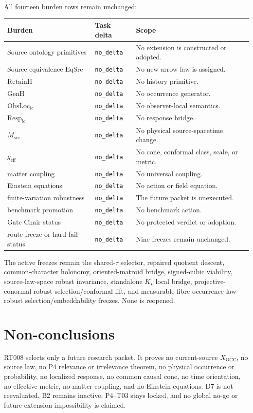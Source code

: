 \documentclass[11pt]{article}
\newcommand{\NoDelta}{\texttt{no\_delta}}
\begin{document}
All fourteen burden rows remain unchanged:
\begin{longtable}{p{}p{}p{}}
\toprule
Burden & Task delta & Scope \\
\midrule
\endhead
Source ontology primitives & \NoDelta & No extension is constructed or adopted. \\
Source equivalence $\mathrm{EqSrc}$ & \NoDelta & No new arrow law is assigned. \\
$\mathrm{RetainH}$ & \NoDelta & No history primitive. \\
$\mathrm{GenH}$ & \NoDelta & No occurrence generator. \\
$\mathrm{ObsLoc}_{lc}$ & \NoDelta & No observer-local semantics. \\
$\mathrm{Resp}_{lc}$ & \NoDelta & No response bridge. \\
$M_{\mathrm{src}}$ & \NoDelta & No physical source-spacetime change. \\
$g_{\mathrm{eff}}$ & \NoDelta & No cone, conformal class, scale, or metric. \\
matter coupling & \NoDelta & No universal coupling. \\
Einstein equations & \NoDelta & No action or field equation. \\
finite-variation robustness & \NoDelta & The future packet is unexecuted. \\
benchmark promotion & \NoDelta & No benchmark action. \\
Gate Chair status & \NoDelta & No protected verdict or adoption. \\
route freeze or hard-fail status & \NoDelta & Nine freezes remain unchanged. \\
\bottomrule
\end{longtable}

The active freezes remain the shared-$\tau$ selector, repaired quotient descent,
common-character holonomy, oriented-matroid bridge, signed-cubic viability,
source-law-space robust invariance, standalone $K_\star$ local bridge,
projective-conormal robust selection/conformal lift, and measurable-fibre
occurrence-law robust selection/embeddability freezes.  None is reopened.

\section*{Non-conclusions}

RT008 selects only a future research packet.  It proves no current-source
$X_{\mathrm{OCC}}$, no source law, no P4 relevance or irrelevance theorem, no
physical occurrence or probability, no localized response, no common causal
cone, no time orientation, no effective metric, no matter coupling, and no
Einstein equations.  D7 is not reevaluated, B2 remains inactive, P4--T03 stays
locked, and no global no-go or future-extension impossibility is claimed.
\end{document}
